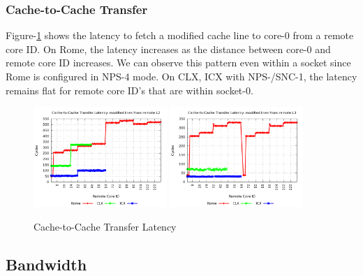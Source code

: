 \documentclass{article}
\begin{document}
\subsubsection{Cache-to-Cache Transfer}
Figure-\ref{figure:mlc_c2c_modified} shows the latency to fetch a modified cache line to core-0 from a remote core ID. On Rome, the latency increases as the distance between core-0 and remote core ID increases. We can observe this pattern even within a socket since Rome is configured in NPS-4 mode. On CLX, ICX with NPS-/SNC-1, the latency remains flat for remote core ID's that are within socket-0.
\begin{figure}[!hb]
    \centering
    \includegraphics[width=0.45\textwidth]{../data/mlc/c2c_modified_l2}
    \includegraphics[width=0.45\textwidth]{../data/mlc/c2c_modified_l3}
    \caption{Cache-to-Cache Transfer Latency}
    \label{figure:mlc_c2c_modified}
\end{figure}

\subsection{Bandwidth}
\end{document}
